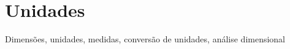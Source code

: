 \chapter{Unidades}
\label{Chap:Unidades}

Dimensões, unidades, medidas, conversão de unidades, análise dimensional
